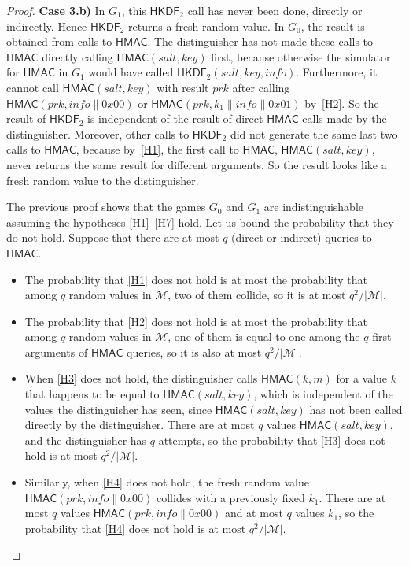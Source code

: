 \documentclass[compsoc, conference, letterpaper, 10pt, times]{IEEEtran}
\newcommand{\HKDF}{\mathsf{HKDF}}
\newcommand{\hkdftwo}{\HKDF_2}
\newcommand{\salt}{\mathit{salt}}
\newcommand{\key}{\mathit{key}}
\newcommand{\info}{\mathit{info}}
\newcommand{\prk}{\mathit{prk}}
\newcommand{\hmac}{\mathsf{HMAC}}
\newcommand{\Smac}{\mathcal{M}}
\begin{document}
\begin{proof}
{\bf Case 3.b)} In $G_1$, this $\hkdftwo$ call has never been done, directly or indirectly.
Hence $\hkdftwo$ returns a fresh random value.
%
In $G_0$, the result is obtained from calls to $\hmac$. The distinguisher has not made these
calls to $\hmac$ directly calling $\hmac(\salt,\key)$ first, because otherwise the simulator for $\hmac$ in $G_1$ would have called $\hkdftwo(\salt,\key,\info)$. Furthermore, it cannot call $\hmac(\salt,\key)$ with result $\prk$ after calling $\hmac(\prk, \info\|0x00)$ or $\hmac(\prk, k_1 \|\info\|0x01)$ by~\ref{H2}.
So the result of $\hkdftwo$ is independent of the result of direct $\hmac$ calls made by the distinguisher.
Moreover, other calls to $\hkdftwo$ did not generate the same last two calls to $\hmac$, because by~\ref{H1}, the first call to $\hmac$, $\hmac(\salt,\key)$, never returns the same result for different arguments. %
So the result looks like a fresh random value to the distinguisher.

\bigskip
The previous proof shows that the games $G_0$ and $G_1$ are indistinguishable
assuming the hypotheses \ref{H1}--\ref{H7} hold. Let us bound the
probability that they do not hold. Suppose that there are at most $q$ (direct or indirect) queries to $\hmac$.
\begin{itemize}
  
\item The probability that \ref{H1} does not hold is at most the probability that among $q$ random values in $\Smac$, two of them collide, so it is at most $q^2/|\Smac|$.

\item The probability that \ref{H2} does not hold is at most the probability that among $q$ random values in $\Smac$, one of them is equal to one among the $q$ first arguments of $\hmac$ queries, so it is also at most $q^2/|\Smac|$.

\item When \ref{H3} does not hold, the distinguisher calls $\hmac(k,m)$ for a value $k$ that happens to be equal to $\hmac(\salt,\key)$, which is independent of the values the distinguisher has seen, since $\hmac(\salt,\key)$ has not been called directly by the distinguisher. There are at most $q$ values $\hmac(\salt,\key)$, and the distinguisher has $q$ attempts, so the probability that \ref{H3} does not hold is at most  $q^2/|\Smac|$.

\item Similarly, when \ref{H4} does not hold, the fresh random value $\hmac(\prk, \info\|0x00)$ collides with a previously fixed $k_1$. There are at most $q$ values $\hmac(\prk, \info\|0x00)$ and at most $q$ values $k_1$, so the probability that \ref{H4} does not hold is at most  $q^2/|\Smac|$.


\end{itemize}
\end{proof}
\end{document}
